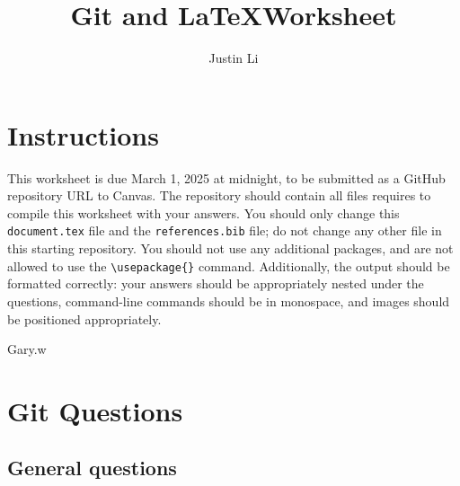 \documentclass[10pt,twocolumn]{article}
\title{Git and \LaTeX Worksheet}
\author{Justin Li}
\affiliation{Occidental College}
\begin{document}
\maketitle

\section{Instructions}

This worksheet is due March 1, 2025 at midnight, to be submitted as a GitHub repository URL to Canvas. The repository should contain all files requires to compile this worksheet with your answers. You should only change this \texttt{document.tex} file and the  \texttt{references.bib} file; do not change any other file in this starting repository. You should not use any additional packages, and are not allowed to use the \texttt{{\textbackslash}usepackage\{\}} command. Additionally, the output should be formatted correctly: your answers should be appropriately nested under the questions, command-line commands should be in monospace, and images should be positioned appropriately.

Gary.w
\section{Git Questions}

\subsection{General questions}
\end{document}
